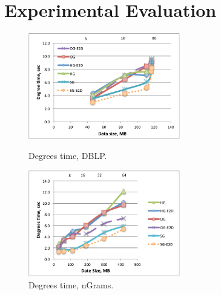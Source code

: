 \section{Experimental Evaluation}
\label{sec:exp}

\begin{figure}[t!]
\centering
\begin{minipage}{3in}
  \centering
  \includegraphics[width=2.6in]{figs/degrees_dblp.pdf}
  \vspace{-0.1in}
  \caption{Degrees time, DBLP.}
  \label{fig:deg_dblp}
  \vspace{-0.1in}
\end{minipage}
\begin{minipage}{3in}
  \centering
\includegraphics[width=2.6in]{figs/degrees_ngrams.pdf}
  \vspace{-0.1in}
\caption{Degrees time, nGrams.}
\label{fig:deg_ngrams}
  \vspace{-0.1in}
\end{minipage}
\end{figure}

